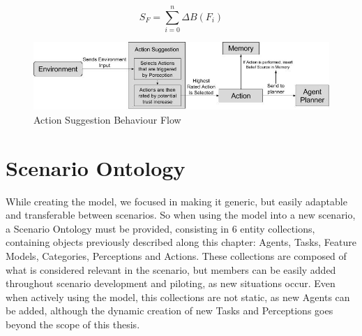 \begin{equation}
    S_F = \sum_{i=0}^{n} \Delta B(F_i)
    \label{eq:ActionSuggestionLinear}
\end{equation}


\begin{figure}[hbt]
    \centering
    \includegraphics[width=\textwidth]{figures/ActionSuggestionDiagram.jpg}
    \caption{Action Suggestion Behaviour Flow}
    \label{fig:ActionSuggestionDiagram}
\end{figure}


\section{Scenario Ontology}
\label{sec:Scenario Ontology}
While creating the model, we focused in making it generic, but easily adaptable and transferable between scenarios. So when using the model into a new scenario, a Scenario Ontology must be provided, consisting in 6 entity collections, containing objects previously described along this chapter: Agents, Tasks, Feature Models, Categories, Perceptions and Actions. These collections are composed of what is considered relevant in the scenario, but members can be easily added throughout scenario development and piloting, as new situations occur. Even when actively using the model, this collections are not static, as new Agents can be added, although the dynamic creation of new Tasks and Perceptions goes beyond the scope of this thesis. 

 